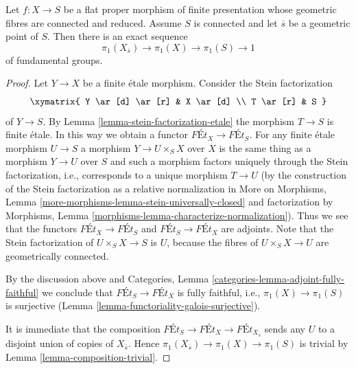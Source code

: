 \begin{proposition}
\label{proposition-first-homotopy-sequence}
Let $f : X \to S$ be a flat proper morphism of finite presentation whose
geometric fibres are connected and reduced. Assume $S$ is connected and
let $\overline{s}$ be a geometric point of $S$. Then there is an exact
sequence
$$
\pi_1(X_{\overline{s}}) \to \pi_1(X) \to \pi_1(S) \to 1
$$
of fundamental groups.
\end{proposition}

\begin{proof}
Let $Y \to X$ be a finite \'etale morphism. Consider the Stein factorization
$$
\xymatrix{
Y \ar[d] \ar[r] & X \ar[d] \\
T \ar[r] & S
}
$$
of $Y \to S$. By Lemma \ref{lemma-stein-factorization-etale}
the morphism $T \to S$ is finite \'etale. In this way we obtain
a functor $\textit{F\'Et}_X \to \textit{F\'Et}_S$.
For any finite \'etale morphism $U \to S$ a morphism
$Y \to U \times_S X$ over $X$ is the same thing as a morphism
$Y \to U$ over $S$ and such a morphism factors uniquely through
the Stein factorization, i.e., corresponds to a unique
morphism $T \to U$
(by the construction of the Stein factorization as a relative
normalization in More on Morphisms, Lemma
\ref{more-morphisms-lemma-stein-universally-closed}
and factorization by
Morphisms, Lemma \ref{morphisms-lemma-characterize-normalization}).
Thus we see that the functors
$\textit{F\'Et}_X \to \textit{F\'Et}_S$ and
$\textit{F\'Et}_S \to \textit{F\'Et}_X$ are adjoints.
Note that the Stein factorization of $U \times_S X \to S$ is
$U$, because the fibres of $U \times_S X \to U$ are geometrically connected.

\medskip\noindent
By the discussion above and
Categories, Lemma \ref{categories-lemma-adjoint-fully-faithful}
we conclude that
$\textit{F\'Et}_S \to \textit{F\'Et}_X$
is fully faithful, i.e., $\pi_1(X) \to \pi_1(S)$ is surjective
(Lemma \ref{lemma-functoriality-galois-surjective}).

\medskip\noindent
It is immediate that the composition
$\textit{F\'Et}_S \to \textit{F\'Et}_X \to \textit{F\'Et}_{X_{\overline{s}}}$
sends any $U$ to a disjoint union of copies of $X_{\overline{s}}$.
Hence $\pi_1(X_{\overline{s}}) \to \pi_1(X) \to \pi_1(S)$ is trivial
by Lemma \ref{lemma-composition-trivial}.


\end{proof}
